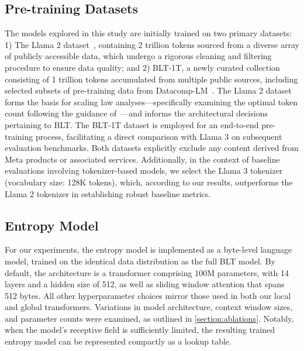 \subsection{Pre-training Datasets} The models explored in this study are initially trained on two primary datasets: 1) The Llama 2 dataset~\citep{touvron2023llama}, containing 2 trillion tokens sourced from a diverse array of publicly accessible data, which undergo a rigorous cleaning and filtering procedure to ensure data quality; and 2) {\textsc BLT}-1T, a newly curated collection consisting of 1 trillion tokens accumulated from multiple public sources, including selected subsets of pre-training data from Datacomp-LM~\citep{li2024datacomp}. The Llama 2 dataset forms the basis for scaling law analyses—specifically examining the optimal token count following the guidance of~\cite{dubey2024llama}—and informs the architectural decisions pertaining to {\textsc BLT}. The {\textsc BLT}-1T dataset is employed for an end-to-end pre-training process, facilitating a direct comparison with Llama 3 on subsequent evaluation benchmarks. Both datasets explicitly exclude any content derived from Meta products or associated services. Additionally, in the context of baseline evaluations involving tokenizer-based models, we select the Llama 3 tokenizer (vocabulary size: 128K tokens), which, according to our results, outperforms the Llama 2 tokenizer in establishing robust baseline metrics.

\subsection{Entropy Model} For our experiments, the entropy model is implemented as a byte-level language model, trained on the identical data distribution as the full {\textsc BLT} model. By default, the architecture is a transformer comprising 100M parameters, with 14 layers and a hidden size of 512, as well as sliding window attention that spans 512 bytes. All other hyperparameter choices mirror those used in both our local and global transformers. Variations in model architecture, context window sizes, and parameter counts were examined, as outlined in \autoref{section:ablations}. Notably, when the model’s receptive field is sufficiently limited, the resulting trained entropy model can be represented compactly as a lookup table.

